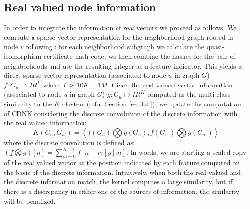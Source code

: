 \subsection{Real valued node information}
In order to integrate the information of real vectors we proceed as follows. We compute a sparse vector representation for the neighborhood graph rooted in node $v$ following \cite{costa2010fast}: for each neighborhood subgraph we calculate the quasi-isomorphism certificate hash code; we then combine the hashes for the pair of neighborhoods and use the resulting integer as a feature indicator. This yields a direct sparse vector representation (associated to node $u$ in graph $G$) $f: G_u \longmapsto I\!R^L$ where $L \approx 10K-1M$. Given the real valued vector information (associated to node $u$ in graph $G$) $g: G_u \longmapsto I\!R^K$ computed as the multi-class similarity to the $K$ clusters (c.f.r. Section \ref{sec:lab}), we update the computation of CDNK considering the discrete convolution of the discrete information with the real valued information:   
\begin{equation}
K(G_u,G_{u'}) = \left< f(G_u) \bigotimes g(G_u), f(G_{u'}) \bigotimes g(G_{u'}) \right>
\end{equation}
where the discrete convolution is defined as: 
$(f \bigotimes g)[n]=\sum _{m=0}^{K-1}f[n-m]g[m].$
In words, we are starting a scaled copy of the real valued vector at the position indicated by each feature computed on the basis of the discrete information. Intuitively, when both the real valued and the discrete information match, the kernel computes a large similarity, but if there is a discrepancy in either one of the sources of information, the similarity will be penalized. 


